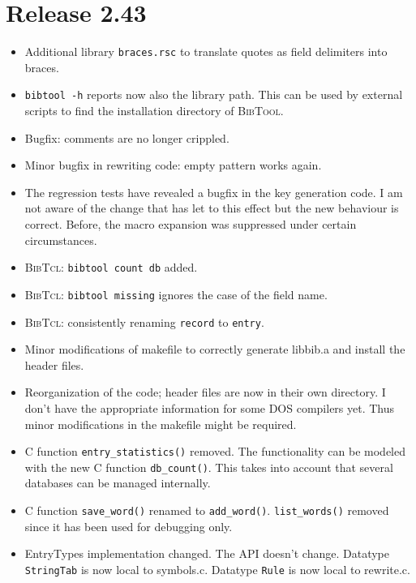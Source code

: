 \documentclass[11pt,a4paper]{scrartcl}
\newcommand\rsc[1]{\texttt{#1}}
\newcommand\File[1]{\textsf{#1}}
\newcommand\BibTool{\textsc{BibTool}}
\newcommand\BibTcl{\textsc{BibTcl}}
\newenvironment{Release}[2]{\section*{Release #1}\begin{itemize}}{\end{itemize}}
\newenvironment{Fix}[1]{\item }{}
\newenvironment{New}[1]{\item }{}
\newenvironment{Update}[1]{\item }{}
\begin{document}
 \begin{Release}{2.43}{}
  \begin{New}{gene}
    Additional library \rsc{braces.rsc} to translate quotes as field
    delimiters into braces.
  \end{New}
  \begin{Update}{gene}
    \verb|bibtool -h| reports now also the library path. This can be
    used by external scripts to find the installation directory of
    \BibTool.
  \end{Update}
  \begin{Fix}{gene}
    Bugfix: comments are no longer crippled.
  \end{Fix}
  \begin{Fix}{gene}
    Minor bugfix in rewriting code: empty pattern works again.
  \end{Fix}
  \begin{Fix}{gene}
    The regression tests have revealed a bugfix in the key generation code. I
    am not aware of the change that has let to this effect but the new
    behaviour is correct. Before, the macro expansion was suppressed under
    certain circumstances.
  \end{Fix}
  \begin{New}{gene}
    \BibTcl: \verb|bibtool count db| added.
  \end{New}
  \begin{Fix}{gene}
    \BibTcl: \verb|bibtool missing| ignores the case of the field
    name.
  \end{Fix}
  \begin{Update}{gene}
    \BibTcl: consistently renaming \verb|record| to \verb|entry|.
  \end{Update}
  \begin{Fix}{gene}
    Minor modifications of makefile to correctly generate
    \File{libbib.a} and install the header files.
  \end{Fix}
  \begin{Update}{gene}
    Reorganization of the code; header files are now in their own directory. I
    don't have the appropriate information for some DOS compilers yet.
    Thus minor modifications in the makefile might be required.
  \end{Update}
  \begin{New}{gene}
    C function \verb|entry_statistics()| removed. The functionality
    can be modeled with the new C function \verb|db_count()|. This
    takes into account that several databases can be managed
    internally.
  \end{New}
  \begin{Update}{gene}
    C function \verb|save_word()| renamed to \verb|add_word()|.
    \verb|list_words()| removed since it has been used for debugging
    only.
  \end{Update}
  \begin{Update}{gene}
    EntryTypes implementation changed. The API doesn't change.
    Datatype \verb|StringTab| is now local to \File{symbols.c}.
    Datatype \verb|Rule| is now local to \File{rewrite.c}.
  \end{Update}
 \end{Release}
\end{document}
